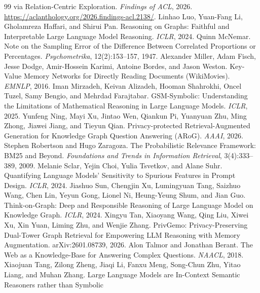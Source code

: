 \documentclass{article}
\begin{document}
\begin{thebibliography}{99}
via Relation-Centric Exploration. \emph{Findings of ACL}, 2026.
\url{https://aclanthology.org/2026.findings-acl.2138/}.
Linhao Luo, Yuan-Fang Li, Gholamreza Haffari, and Shirui Pan.
Reasoning on Graphs: Faithful and Interpretable Large Language Model Reasoning.
\emph{ICLR}, 2024.
Quinn McNemar.
Note on the Sampling Error of the Difference Between Correlated Proportions
or Percentages. \emph{Psychometrika}, 12(2):153--157, 1947.
Alexander Miller, Adam Fisch, Jesse Dodge, Amir-Hossein Karimi, Antoine Bordes,
and Jason Weston.
Key-Value Memory Networks for Directly Reading Documents (WikiMovies).
\emph{EMNLP}, 2016.
Iman Mirzadeh, Keivan Alizadeh, Hooman Shahrokhi, Oncel Tuzel, Samy Bengio, and
Mehrdad Farajtabar.
GSM-Symbolic: Understanding the Limitations of Mathematical Reasoning in Large
Language Models. \emph{ICLR}, 2025.
Yunfeng Ning, Mayi Xu, Jintao Wen, Qiankun Pi, Yuanyuan Zhu, Ming Zhong,
Jiawei Jiang, and Tieyun Qian.
Privacy-protected Retrieval-Augmented Generation for Knowledge Graph Question
Answering (ARoG). \emph{AAAI}, 2026.
Stephen Robertson and Hugo Zaragoza.
The Probabilistic Relevance Framework: {BM25} and Beyond.
\emph{Foundations and Trends in Information Retrieval}, 3(4):333--389, 2009.
Melanie Sclar, Yejin Choi, Yulia Tsvetkov, and Alane Suhr.
Quantifying Language Models' Sensitivity to Spurious Features in Prompt Design.
\emph{ICLR}, 2024.
Jiashuo Sun, Chengjin Xu, Lumingyuan Tang, Saizhuo Wang, Chen Lin, Yeyun Gong,
Lionel Ni, Heung-Yeung Shum, and Jian Guo.
Think-on-Graph: Deep and Responsible Reasoning of Large Language Model on
Knowledge Graph. \emph{ICLR}, 2024.
Xingyu Tan, Xiaoyang Wang, Qing Liu, Xiwei Xu, Xin Yuan, Liming Zhu, and
Wenjie Zhang.
PrivGemo: Privacy-Preserving Dual-Tower Graph Retrieval for Empowering LLM
Reasoning with Memory Augmentation. arXiv:2601.08739, 2026.
Alon Talmor and Jonathan Berant.
The Web as a Knowledge-Base for Answering Complex Questions.
\emph{NAACL}, 2018.
Xiaojuan Tang, Zilong Zheng, Jiaqi Li, Fanxu Meng, Song-Chun Zhu, Yitao Liang,
and Muhan Zhang.
Large Language Models are In-Context Semantic Reasoners rather than Symbolic

\end{thebibliography}
\end{document}
